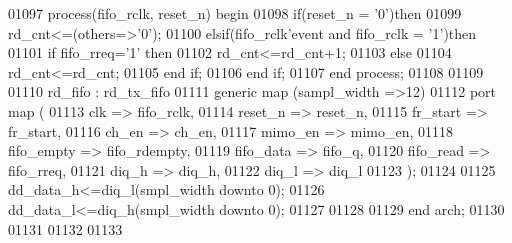 \begin{DoxyCode}
01097 \textcolor{keywordflow}{process}(fifo_rclk, reset_n) \textcolor{keywordflow}{begin}
01098     \textcolor{keywordflow}{if}\textcolor{vhdlchar}{(}\textcolor{vhdlchar}{reset_n} \textcolor{vhdlchar}{=} \textcolor{vhdlchar}{'}\textcolor{vhdllogic}{}\textcolor{vhdllogic}{0}\textcolor{vhdlchar}{'}\textcolor{vhdlchar}{)}\textcolor{keywordflow}{then}
01099         \textcolor{vhdlchar}{rd_cnt}\textcolor{vhdlchar}{<=}\textcolor{vhdlchar}{(}\textcolor{keywordflow}{others}\textcolor{vhdlchar}{=}\textcolor{vhdlchar}{>}\textcolor{vhdlchar}{'}\textcolor{vhdllogic}{}\textcolor{vhdllogic}{0}\textcolor{vhdlchar}{'}\textcolor{vhdlchar}{)};
01100     \textcolor{keywordflow}{elsif}\textcolor{vhdlchar}{(}\textcolor{vhdlchar}{fifo_rclk}\textcolor{vhdlchar}{'}\textcolor{vhdlkeyword}{event} \textcolor{keywordflow}{and} \textcolor{vhdlchar}{fifo_rclk} \textcolor{vhdlchar}{=} \textcolor{vhdlchar}{'}\textcolor{vhdllogic}{}\textcolor{vhdllogic}{1}\textcolor{vhdlchar}{'}\textcolor{vhdlchar}{)}\textcolor{keywordflow}{then}
01101         \textcolor{keywordflow}{if} \textcolor{vhdlchar}{fifo_rreq}\textcolor{vhdlchar}{=}\textcolor{vhdlchar}{'}\textcolor{vhdllogic}{}\textcolor{vhdllogic}{1}\textcolor{vhdlchar}{'} \textcolor{keywordflow}{then}       
01102             \textcolor{vhdlchar}{rd_cnt}\textcolor{vhdlchar}{<=}\textcolor{vhdlchar}{rd_cnt}\textcolor{vhdlchar}{+}\textcolor{vhdllogic}{}\textcolor{vhdllogic}{1};
01103             \textcolor{keywordflow}{else} 
01104             \textcolor{vhdlchar}{rd_cnt}\textcolor{vhdlchar}{<=}\textcolor{vhdlchar}{rd_cnt};
01105         \textcolor{keywordflow}{end} \textcolor{keywordflow}{if};
01106     \textcolor{keywordflow}{end} \textcolor{keywordflow}{if}; 
01107 \textcolor{keywordflow}{end} \textcolor{keywordflow}{process};
01108 
01109 
01110 rd_fifo : rd_tx_fifo 
01111   \textcolor{keywordflow}{generic} \textcolor{keywordflow}{map} (sampl_width =>\textcolor{vhdllogic}{12}\textcolor{vhdlchar}{)}
01112   \textcolor{keywordflow}{port} \textcolor{keywordflow}{map} (
01113       clk           => fifo_rclk,
01114       reset_n       => reset_n, 
01115       fr_start      => fr_start, 
01116       ch_en         => ch_en,
01117       mimo_en       => mimo_en,
01118       fifo_empty    => fifo_rdempty,
01119       fifo_data => fifo_q, 
01120       fifo_read => fifo_rreq, 
01121       diq_h         => diq_h, 
01122       diq_l         => diq_l
01123         \textcolor{vhdlchar}{)};
01124 
01125 \textcolor{vhdlchar}{dd_data_h}\textcolor{vhdlchar}{<=}\textcolor{vhdlchar}{diq_l}\textcolor{vhdlchar}{(}\textcolor{vhdlchar}{smpl_width} \textcolor{keywordflow}{downto} \textcolor{vhdllogic}{}\textcolor{vhdllogic}{0}\textcolor{vhdlchar}{)};
01126 \textcolor{vhdlchar}{dd_data_l}\textcolor{vhdlchar}{<=}\textcolor{vhdlchar}{diq_h}\textcolor{vhdlchar}{(}\textcolor{vhdlchar}{smpl_width} \textcolor{keywordflow}{downto} \textcolor{vhdllogic}{}\textcolor{vhdllogic}{0}\textcolor{vhdlchar}{)};
01127 
01128         
01129 \textcolor{keywordflow}{end} \textcolor{vhdlchar}{arch};   
01130 
01131 
01132 
01133 
\end{DoxyCode}
